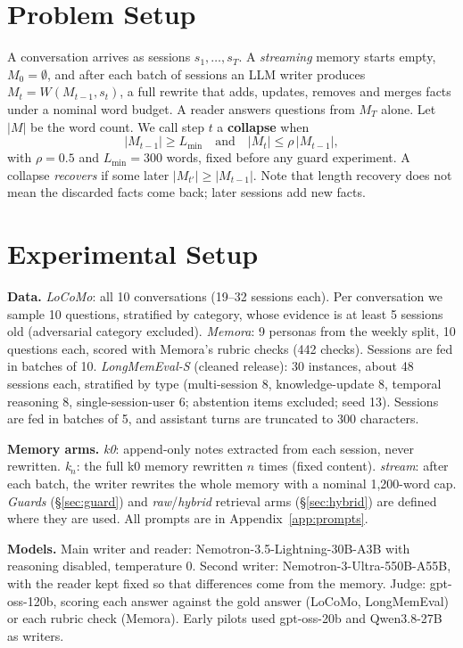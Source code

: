 \documentclass[11pt]{article}
\begin{document}
\section{Problem Setup}\label{sec:setup0}
A conversation arrives as sessions $s_1,\dots,s_T$. A \emph{streaming} memory starts empty, $M_0=\emptyset$, and after each batch of sessions an LLM writer produces $M_t = W(M_{t-1}, s_t)$, a full rewrite that adds, updates, removes and merges facts under a nominal word budget. A reader answers questions from $M_T$ alone. Let $|M|$ be the word count. We call step $t$ a \textbf{collapse} when
\begin{equation}
|M_{t-1}| \ge L_{\min} \quad\text{and}\quad |M_t| \le \rho\,|M_{t-1}|,
\end{equation}
with $\rho{=}0.5$ and $L_{\min}{=}300$ words, fixed before any guard experiment. A collapse \emph{recovers} if some later $|M_{t'}| \ge |M_{t-1}|$. Note that length recovery does not mean the discarded facts come back; later sessions add new facts.

\section{Experimental Setup}\label{sec:setup}
\textbf{Data.} \emph{LoCoMo}: all 10 conversations (19--32 sessions each). Per conversation we sample 10 questions, stratified by category, whose evidence is at least 5 sessions old (adversarial category excluded). \emph{Memora}: 9 personas from the weekly split, 10 questions each, scored with Memora's rubric checks (442 checks). Sessions are fed in batches of 10. \emph{LongMemEval-S} (cleaned release): 30 instances, about 48 sessions each, stratified by type (multi-session 8, knowledge-update 8, temporal reasoning 8, single-session-user 6; abstention items excluded; seed 13). Sessions are fed in batches of 5, and assistant turns are truncated to 300 characters.

\textbf{Memory arms.} \emph{k0}: append-only notes extracted from each session, never rewritten. \emph{k}$_n$: the full k0 memory rewritten $n$ times (fixed content). \emph{stream}: after each batch, the writer rewrites the whole memory with a nominal 1,200-word cap. \emph{Guards} (\S\ref{sec:guard}) and \emph{raw}/\emph{hybrid} retrieval arms (\S\ref{sec:hybrid}) are defined where they are used. All prompts are in Appendix~\ref{app:prompts}.

\textbf{Models.} Main writer and reader: Nemotron-3.5-Lightning-30B-A3B with reasoning disabled, temperature 0. Second writer: Nemotron-3-Ultra-550B-A55B, with the reader kept fixed so that differences come from the memory. Judge: gpt-oss-120b, scoring each answer against the gold answer (LoCoMo, LongMemEval) or each rubric check (Memora). Early pilots used gpt-oss-20b and Qwen3.8-27B as writers.
\end{document}
